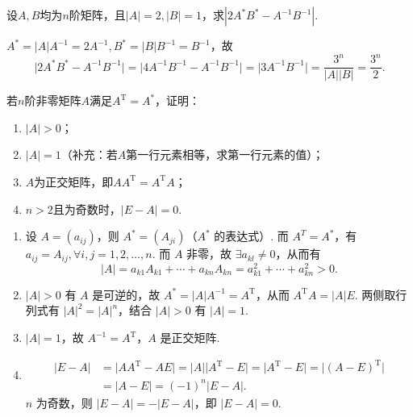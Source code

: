 \begin{exercise}
\begin{exgroup}
        \item 设$A,B$均为$n$阶矩阵，且$|A|=2,|B|=1$，求$|2A^*B^*-A^{-1}B^{-1}|$.
        \begin{answer}
            $A^* = \lvert A \rvert A^{-1} = 2A^{-1}, B^* = \lvert B \rvert B^{-1} = B^{-1}$，故 \[\lvert 2A^*B^*-A^{-1}B^{-1} \rvert = \lvert 4A^{-1}B^{-1}-A^{-1}B^{-1} \rvert = \lvert 3A^{-1}B^{-1} \rvert = \dfrac{3^n}{\lvert A \rvert \lvert B \rvert} = \dfrac{3^n}{2}.\]
        \end{answer}

        \item 若$n$阶非零矩阵$A$满足$A^\mathrm{T}=A^*$，证明：
        \begin{enumerate}
            \item $|A|>0$；

            \item $|A|=1$（补充：若$A$第一行元素相等，求第一行元素的值）；

            \item $A$为正交矩阵，即$AA^\mathrm{T}=A^\mathrm{T}A$；

            \item $n>2$且为奇数时，$|E-A|=0$.
        \end{enumerate}
        \begin{answer}
            \begin{enumerate}
                \item 设 $A = (a_{ij})$，则 $A^* = (A_{ji})$（$A^*$ 的表达式）. 而 $A^T = A^*$，有 $a_{ij} = A_{ij}, \forall i, j = 1, 2, \ldots, n$. 而 $A$ 非零，故 $\exists a_{kl} \neq 0$，从而有 \[ \lvert A \rvert = a_{k1}A_{k1}+\cdots+a_{kn}A_{kn} = a_{k1}^2+\cdots+a_{kn}^2 > 0.\]

                \item $\lvert A \rvert > 0$ 有 $A$ 是可逆的，故 $A^* = \lvert A \rvert A^{-1} = A^{\mathrm{T}}$，从而 $A^{\mathrm{T}}A = \lvert A \rvert E$. 两侧取行列式有 $\lvert A \rvert^2 = \lvert A \rvert^n $，结合 $\lvert A \rvert > 0$ 有 $\lvert A \rvert = 1$.

                \item $\lvert A \rvert = 1$，故 $A^{-1} = A^{\mathrm{T}}$，$A$ 是正交矩阵.

                \item \begin{align*}
                          \lvert E-A \rvert & = \lvert AA^{\mathrm{T}}-AE \rvert = \lvert A \rvert \lvert A^{\mathrm{T}}-E\rvert = \lvert A^{\mathrm{T}}-E\rvert = \lvert (A-E)^{\mathrm{T}} \rvert \\
                                            & = \lvert A-E \rvert = (-1)^n\lvert E-A \rvert.
                      \end{align*}
                      $n$ 为奇数，则 $\lvert E-A \rvert = -\lvert E-A \rvert$，即 $\lvert E-A \rvert = 0$.
            \end{enumerate}
        \end{answer}


\end{exgroup}
\end{exercise}
